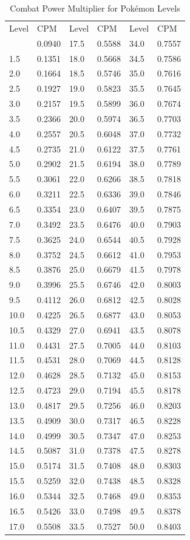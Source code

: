 \begin{table}
\centering
\begin{tabular}{l l|l l|l l}
Level & CPM & Level & CPM & Level & CPM \\
\Midrule
1.0 & 0.0940 & 17.5 & 0.5588 & 34.0 & 0.7557 \\ 
1.5 & 0.1351 & 18.0 & 0.5668 & 34.5 & 0.7586 \\
2.0 & 0.1664 & 18.5 & 0.5746 & 35.0 & 0.7616 \\
2.5 & 0.1927 & 19.0 & 0.5823 & 35.5 & 0.7645 \\
3.0 & 0.2157 & 19.5 & 0.5899 & 36.0 & 0.7674 \\
3.5 & 0.2366 & 20.0 & 0.5974 & 36.5 & 0.7703 \\
4.0 & 0.2557 & 20.5 & 0.6048 & 37.0 & 0.7732 \\
4.5 & 0.2735 & 21.0 & 0.6122 & 37.5 & 0.7761 \\
5.0 & 0.2902 & 21.5 & 0.6194 & 38.0 & 0.7789 \\
5.5 & 0.3061 & 22.0 & 0.6266 & 38.5 & 0.7818 \\
6.0 & 0.3211 & 22.5 & 0.6336 & 39.0 & 0.7846 \\
6.5 & 0.3354 & 23.0 & 0.6407 & 39.5 & 0.7875 \\
7.0 & 0.3492 & 23.5 & 0.6476 & 40.0 & 0.7903 \\
7.5 & 0.3625 & 24.0 & 0.6544 & 40.5 & 0.7928 \\
8.0 & 0.3752 & 24.5 & 0.6612 & 41.0 & 0.7953 \\
8.5 & 0.3876 & 25.0 & 0.6679 & 41.5 & 0.7978 \\
9.0 & 0.3996 & 25.5 & 0.6746 & 42.0 & 0.8003 \\
9.5 & 0.4112 & 26.0 & 0.6812 & 42.5 & 0.8028 \\
10.0 & 0.4225 & 26.5 & 0.6877 & 43.0 & 0.8053 \\
10.5 & 0.4329 & 27.0 & 0.6941 & 43.5 & 0.8078 \\
11.0 & 0.4431 & 27.5 & 0.7005 & 44.0 & 0.8103 \\
11.5 & 0.4531 & 28.0 & 0.7069 & 44.5 & 0.8128 \\
12.0 & 0.4628 & 28.5 & 0.7132 & 45.0 & 0.8153 \\
12.5 & 0.4723 & 29.0 & 0.7194 & 45.5 & 0.8178 \\
13.0 & 0.4817 & 29.5 & 0.7256 & 46.0 & 0.8203 \\
13.5 & 0.4909 & 30.0 & 0.7317 & 46.5 & 0.8228 \\
14.0 & 0.4999 & 30.5 & 0.7347 & 47.0 & 0.8253 \\
14.5 & 0.5087 & 31.0 & 0.7378 & 47.5 & 0.8278 \\
15.0 & 0.5174 & 31.5 & 0.7408 & 48.0 & 0.8303 \\
15.5 & 0.5259 & 32.0 & 0.7438 & 48.5 & 0.8328 \\
16.0 & 0.5344 & 32.5 & 0.7468 & 49.0 & 0.8353 \\
16.5 & 0.5426 & 33.0 & 0.7498 & 49.5 & 0.8378 \\
17.0 & 0.5508 & 33.5 & 0.7527 & 50.0 & 0.8403 \\
\end{tabular}
\caption{Combat Power Multiplier for Pokémon Levels}
\label{table:cpm}
\end{table}

